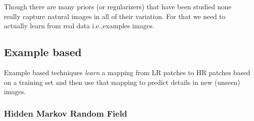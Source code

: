 Though there are many priors (or regularizers) that have been studied none really capture natural images in all of their variation.
%
For that we need to actually learn from real data i.e.,examples images.

\subsection{Example based}\label{subsec:example-based}

Example based techniques \textit{learn} a mapping from
LR patches to HR patches based on a training set and then use that mapping to predict details in new (unseen) images.

\subsubsection{Hidden Markov Random Field}

